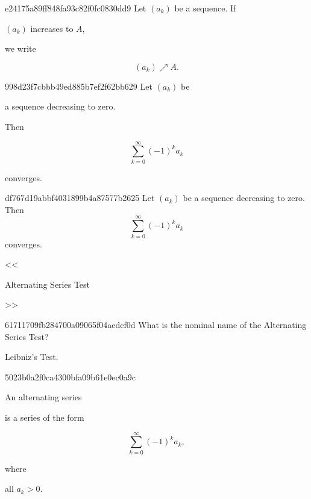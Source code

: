 \begin{note}{e24175a89ff848fa93c82f0fc0830dd9}
    Let \({ (a_k) }\) be a sequence.
    If \begin{icloze}{2}\({ (a_k) }\) increases to \({ A }\),\end{icloze} we write
    \begin{icloze}{1}
        \[
            (a_k) \nearrow A.
        \]
    \end{icloze}
\end{note}

\begin{note}{998d23f7cbbb49ed885b7ef2f62bb629}
    Let \({ (a_k) }\) be \begin{icloze}{3}a sequence decreasing to zero.\end{icloze}
    Then
    \begin{icloze}{2}
        \[
            \sum_{k=0}^{\infty} (-1)^{k}a_k
        \]
    \end{icloze}
    \begin{icloze}{1}converges.\end{icloze}
\end{note}

\begin{note}{df767d19abbf4031899b4a87577b2625}
    Let \({ (a_k) }\) be a sequence decreasing to zero.
    Then
    \[
        \sum_{k=0}^{\infty} (-1)^{k}a_k
    \]
    converges.

    \begin{center}
        \tiny
        <<\begin{icloze}{1}Alternating Series Test\end{icloze}>>
    \end{center}
\end{note}

\begin{note}{61711709fb284700a09065f04aedcf0d}
    What is the nominal name of the Alternating Series Test?

    \begin{cloze}{1}
        Leibniz's Test.
    \end{cloze}
\end{note}

\begin{note}{5023b0a2f0ca4300bfa09b61e0ec0a9c}
    \begin{icloze}{1}An alternating series\end{icloze} is a series of the form
    \begin{icloze}{2}
        \[
            \sum_{k=0}^{\infty} (-1)^{k}a_k,
        \]
    \end{icloze}
    where \begin{icloze}{3}all \({ a_k > 0 }\).\end{icloze}
\end{note}

